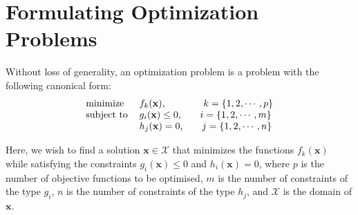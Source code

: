 \section{Formulating Optimization Problems}
\label{sec:formulation}

Without loss of generality, an optimization problem is a problem with the following canonical form:
\[
\begin{tabular}{ll}
minimize        & $f_k(\mathbf{x})$, \ \ \ \ \ \ \ \ \ \ \ $k=\{1,2,\cdots,p\}$ \\ 
subject to      & $g_i(\mathbf{x}) \leq 0$, \ \ \ \ \ $i=\{1,2,\cdots,m\}$ \\
                & $h_j(\mathbf{x}) = 0$, \ \ \ \ \ $j=\{1,2,\cdots,n\}$ \\
\end{tabular}
\]

Here, we wish to find a solution $\mathbf{x} \in \mathcal{X}$ that minimizes the functions $f_k(\mathbf{x})$ while satisfying the constraints $g_i(\mathbf{x}) \leq 0$ and $h_i(\mathbf{x}) = 0$, where $p$ is the number of objective functions to be optimised, $m$ is the number of constraints of the type $g_i$, $n$ is the number of constraints of the type $h_j$, and $\mathcal{X}$ is the domain of $\mathbf{x}$. 

